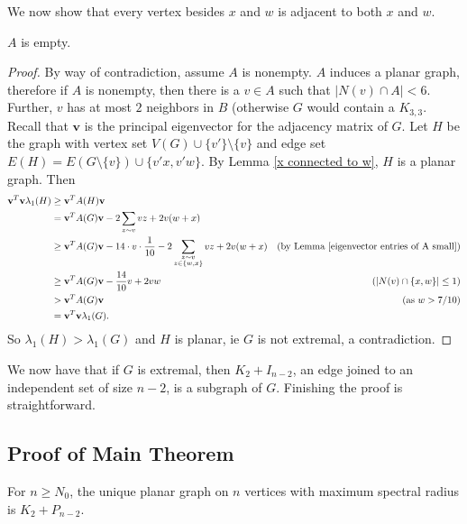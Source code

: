 We now show that every vertex besides $x$ and $w$ is adjacent to both $x$ and $w$.

\begin{lemma}\label{A empty}
$A$ is empty.
\end{lemma}

\begin{proof}
By way of contradiction, assume $A$ is nonempty. $A$ induces a planar graph, therefore if $A$ is nonempty, then there is a $v\in A$ such that $|N(v)\cap A| < 6$. Further, $v$ has at most $2$ neighbors in $B$ (otherwise $G$ would contain a $K_{3,3}$. Recall that $\textbf{v}$ is the principal eigenvector for the adjacency matrix of $G$. Let $H$ be the graph with vertex set $V(G) \cup \{v'\} \setminus \{v\}$ and edge set $E(H) = E(G\setminus\{v\}) \cup \{v'x, v'w\}$. By Lemma \ref{x connected to w}, $H$ is a planar graph. Then 
\begin{align*}
\textbf{v}^T \textbf{v}\lambda_1(H) &\geq \textbf{v}^T A(H) \textbf{v} & \\
& = \textbf{v}^T A(G) \textbf{v} - 2\sum_{z\sim v} vz + 2v(w+x) & \\
& \geq \textbf{v}^T A(G) \textbf{v} - 14\cdot v \cdot \frac{1}{10} - 2\sum_{\substack{z\sim v\\ z\in \{w,x\}}} vz + 2v(w+x) & \mbox{(by Lemma \ref{eigenvector entries of A small})} \\
& \geq \textbf{v}^T A(G) \textbf{v} - \frac{14}{10}v + 2vw & \mbox{($|N(v)\cap \{x,w\}| \leq 1$)} \\
& > \textbf{v}^T A(G) \textbf{v} & \mbox{(as $w>7/10$)}\\
&= \textbf{v}^T\textbf{v} \lambda_1(G).
\end{align*}
So $\lambda_1(H) > \lambda_1(G)$ and $H$ is planar, ie $G$ is not extremal, a contradiction.
\end{proof}


We now have that if $G$ is extremal, then $K_2+I_{n-2}$, an edge joined to an independent set of size $n-2$, is a subgraph of $G$. Finishing the proof is straightforward.

\subsection{Proof of Main Theorem}

\begin{theorem}
For $n\geq N_0$, the unique planar graph on $n$ vertices with maximum spectral radius is $K_{2} + P_{n-2}$.
\end{theorem}

